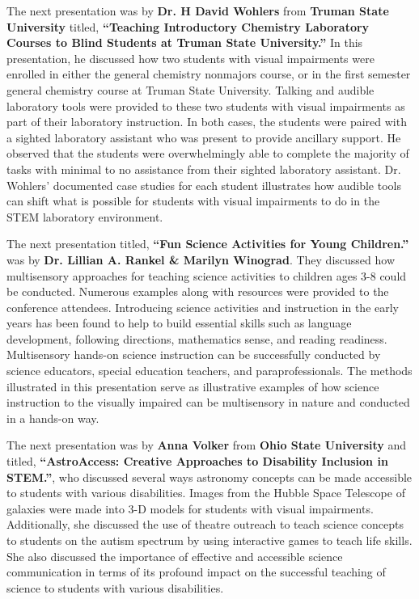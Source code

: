 \documentclass[11.5pt]{sig-alternate} %
\begin{document}
\begin{large}
The next presentation was by \textbf{Dr. H David Wohlers} from \textbf{Truman State University} titled, \textbf{“Teaching Introductory Chemistry Laboratory Courses to Blind Students at Truman State University.”} In this presentation, he discussed how two students with visual impairments were enrolled in either the general chemistry nonmajors course, or in the first semester general chemistry course at Truman State University. Talking and audible laboratory tools were provided to these two students with visual impairments as part of their laboratory instruction. In both cases, the students were paired with a sighted laboratory assistant who was present to provide ancillary support. He observed that the students were overwhelmingly able to complete the majority of tasks with minimal to no assistance from their sighted laboratory assistant. Dr. Wohlers’ documented case studies for each student illustrates how audible tools can shift what is possible for students with visual impairments to do in the STEM laboratory environment. 

The next presentation titled, \textbf{“Fun Science Activities for Young Children.”} was by \textbf{Dr. Lillian A. Rankel \& Marilyn Winograd}. They discussed how multisensory approaches for teaching science activities to children ages 3-8 could be conducted. Numerous examples along with resources were provided to the conference attendees. Introducing science activities and instruction in the early years has been found to help to build essential skills such as language development, following directions, mathematics sense, and reading readiness. Multisensory hands-on science instruction can be successfully conducted by science educators, special education teachers, and paraprofessionals. The methods illustrated in this presentation serve as illustrative examples of how science instruction to the visually impaired can be multisensory in nature and conducted in a hands-on way.

The next presentation was by \textbf{Anna Volker} from \textbf{Ohio State University} and titled, \textbf{“AstroAccess: Creative Approaches to Disability Inclusion in STEM.”}, who discussed several ways astronomy concepts can be made accessible to students with various disabilities. Images from the Hubble Space Telescope of galaxies were made into 3-D models for students with visual impairments. Additionally, she discussed the use of theatre outreach to teach science concepts to students on the autism spectrum by using interactive games to teach life skills. She also discussed the importance of effective and accessible science communication in terms of its profound impact on the successful teaching of science to students with various disabilities.


\end{large}
\end{document}

